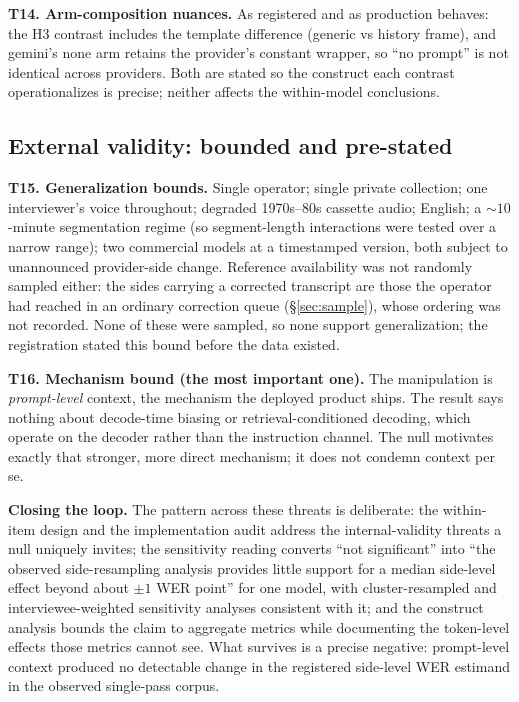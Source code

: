 \documentclass[11pt]{article}
\begin{document}
\textbf{T14. Arm-composition nuances.} As registered and as production behaves: the H3 contrast includes the template difference (generic vs history frame), and gemini's none arm retains the provider's constant wrapper, so ``no prompt'' is not identical across providers. Both are stated so the construct each contrast operationalizes is precise; neither affects the within-model conclusions.

\subsection{External validity: bounded and pre-stated}
\label{sec:extvalidity}

\textbf{T15. Generalization bounds.} Single operator; single private collection; one interviewer's voice throughout; degraded 1970s--80s cassette audio; English; a ${\sim}10$-minute segmentation regime (so segment-length interactions were tested over a narrow range); two commercial models at a timestamped version, both subject to unannounced provider-side change. Reference availability was not randomly sampled either: the sides carrying a corrected transcript are those the operator had reached in an ordinary correction queue (\S\ref{sec:sample}), whose ordering was not recorded. None of these were sampled, so none support generalization; the registration stated this bound before the data existed.

\textbf{T16. Mechanism bound (the most important one).} The manipulation is \emph{prompt-level} context, the mechanism the deployed product ships. The result says nothing about decode-time biasing or retrieval-conditioned decoding, which operate on the decoder rather than the instruction channel. The null motivates exactly that stronger, more direct mechanism; it does not condemn context per se.

\textbf{Closing the loop.} The pattern across these threats is deliberate: the within-item design and the implementation audit address the internal-validity threats a null uniquely invites; the sensitivity reading converts ``not significant'' into ``the observed side-resampling analysis provides little support for a median side-level effect beyond about $\pm 1$ WER point'' for one model, with cluster-resampled and interviewee-weighted sensitivity analyses consistent with it; and the construct analysis bounds the claim to aggregate metrics while documenting the token-level effects those metrics cannot see. What survives is a precise negative: prompt-level context produced no detectable change in the registered side-level WER estimand in the observed single-pass corpus.
\end{document}
